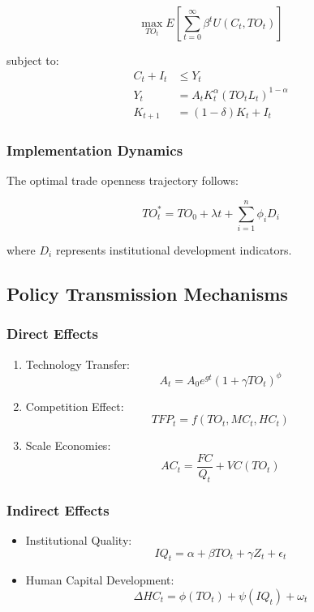\documentclass[12pt,a4paper]{article}
\theoremstyle{definition}
\begin{document}
\begin{equation}
\max_{TO_t} E\left[\sum_{t=0}^{\infty} \beta^t U(C_t, TO_t)\right]
\end{equation}

subject to:
\begin{align}
C_t + I_t &\leq Y_t \\
Y_t &= A_t K_t^\alpha (TO_t L_t)^{1-\alpha} \\
K_{t+1} &= (1-\delta)K_t + I_t
\end{align}

\subsubsection{Implementation Dynamics}
The optimal trade openness trajectory follows:

\begin{equation}
TO_t^* = TO_0 + \lambda t + \sum_{i=1}^n \phi_i D_i
\end{equation}

where $D_i$ represents institutional development indicators.

\subsection{Policy Transmission Mechanisms}
\subsubsection{Direct Effects}
\begin{enumerate}
    \item Technology Transfer:
    \begin{equation}
    A_t = A_0 e^{gt}(1 + \gamma TO_t)^\phi
    \end{equation}
    
    \item Competition Effect:
    \begin{equation}
    TFP_t = f(TO_t, MC_t, HC_t)
    \end{equation}
    
    \item Scale Economies:
    \begin{equation}
    AC_t = \frac{FC}{Q_t} + VC(TO_t)
    \end{equation}
\end{enumerate}

\subsubsection{Indirect Effects}
\begin{itemize}
    \item Institutional Quality:
    \begin{equation}
    IQ_t = \alpha + \beta TO_t + \gamma Z_t + \epsilon_t
    \end{equation}
    
    \item Human Capital Development:
    \begin{equation}
    \Delta HC_t = \phi(TO_t) + \psi(IQ_t) + \omega_t
    \end{equation}
\end{itemize}
\end{document}
